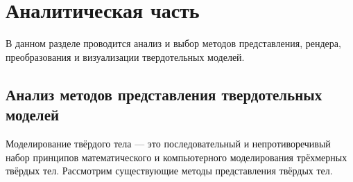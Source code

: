 \section{Аналитическая часть}

В данном разделе проводится анализ и выбор методов представления, рендера, преобразования и визуализации твердотельных моделей.

\subsection{Анализ методов представления твердотельных моделей}

Моделирование твёрдого тела --- это последовательный и 
непротиворечивый набор принципов математического и компьютерного 
моделирования трёхмерных твёрдых тел. 
Рассмотрим 
существующие методы представления твёрдых тел.

%
%
%
%
%
%
%

